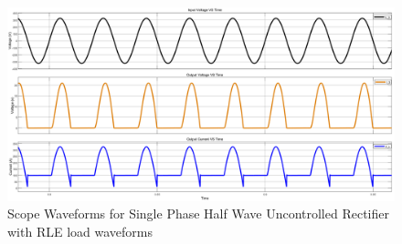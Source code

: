 \begin{figure}[h]
    \centering
    \includegraphics[width=1\textwidth]{images/experiment-1/circuit-scope-experiment-04.png}
    \caption{Scope Waveforms for Single Phase Half Wave Uncontrolled Rectifier with RLE load waveforms}
    \label{Fig_waveform_single-phase-half-wave-uncontrolled-rectifier-with-RLE-load}
\end{figure}

\pagebreak

